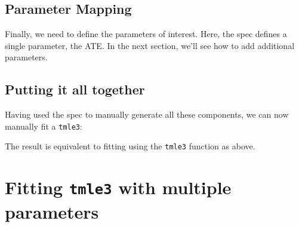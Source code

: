 \documentclass[12pt, krantz2,]{book}
\newenvironment{Shaded}{\begin{snugshade}}{\end{snugshade}}
\newcommand{\CommentTok}[1]{\textcolor[rgb]{0.56,0.35,0.01}{\textit{#1}}}
\newcommand{\KeywordTok}[1]{\textcolor[rgb]{0.13,0.29,0.53}{\textbf{#1}}}
\newcommand{\NormalTok}[1]{#1}
\newcommand{\OperatorTok}[1]{\textcolor[rgb]{0.81,0.36,0.00}{\textbf{#1}}}
\newcommand{\StringTok}[1]{\textcolor[rgb]{0.31,0.60,0.02}{#1}}
\theoremstyle{definition}
\theoremstyle{definition}
\theoremstyle{definition}
\newcommand{\1}{\mathbbm{1}}
\begin{document}
\hypertarget{parameter-mapping}{%
\subsection{Parameter Mapping}\label{parameter-mapping}}

Finally, we need to define the parameters of interest. Here, the spec defines a
single parameter, the ATE. In the next section, we'll see how to add additional
parameters.

\begin{Shaded}
\end{Shaded}

\hypertarget{putting-it-all-together}{%
\subsection{Putting it all together}\label{putting-it-all-together}}

Having used the spec to manually generate all these components, we can now
manually fit a \texttt{tmle3}:

\begin{Shaded}
\end{Shaded}

The result is equivalent to fitting using the \texttt{tmle3} function as above.

\hypertarget{fitting-tmle3-with-multiple-parameters}{%
\section{\texorpdfstring{Fitting \texttt{tmle3} with multiple parameters}{Fitting tmle3 with multiple parameters}}\label{fitting-tmle3-with-multiple-parameters}}
\end{document}
